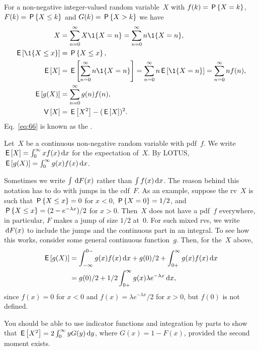 \documentclass[stochastic-or.tex]{subfiles}
\begin{document}
For a non-negative integer-valued random variable~$X$ with  $f(k)= \P{X = k}$,
 $F(k)=\P{X\leq k}$ and  $G(k) = \P{X>k}$ we have
\begin{subequations}\label{eq:105}
\begin{align}
X&=\sum_{n=0}^\infty X\1{X=n} = \sum_{n=0}^\infty n \1{X=n}, \label{eq:77} \\
\E{\1{X\leq x}} &= \P{X\leq x}, \label{eq:74}\\
\E X &= \E{\sum_{n=0}^\infty n \1{X=n}} = \sum_{n=0}^\infty n \E{\1{X=n}} = \sum_{n=0}^\infty n f(n), \label{eq:p-78} \\
  \E{g(X)} &= \sum_{n=0}^\infty g(n) f(n), \label{eq:66} \\
  \V X &= \E{X^2} - (\E X)^2.\label{eq:68}\\
\end{align}
\end{subequations}
Eq.~\cref{eq:66} is known as the .


Let~$X$ be a continuous non-negative random variable with pdf~$f$.
We write $ \E{X} = \int_0^\infty x f(x) \d x$ for the expectation of~$X$. By LOTUS, $\E{g(X)} = \int_0^\infty g(x) f(x) \d x$.

Sometimes we write $\int \d F(x)$ rather than $\int f(x) \d x$.
The reason behind this notation has to do with jumps in the cdf~$F$.
As an example, suppose the rv~$X$ is such that $\P{X\leq x} = 0$ for $x<0$, $\P{X=0} = 1/2$, and $\P{X\leq x} = (2-e^{-\lambda x})/2$ for $x>0$.
Then~$X$ does not have a pdf~$f$ everywhere, in particular, $F$ makes a jump of size $1/2$ at~$0$.
For such mixed rvs, we write $\d F(x)$ to include the jumps and the continuous part in an integral.
To see how this works, consider some general continuous function~$g$.
Then, for the~$X$ above,
\begin{align*}
\E{g(X)} &= \int_{-\infty}^{0-} g(x) f(x) \d x + g(0)/2 + \int_{0+}^{\infty} g(x) f(x) \d x \\
 &= g(0)/2 + 1/2 \int_{0+}^{\infty} g(x) \lambda e^{-\lambda x} \d x,
\end{align*}
since $f(x) = 0$ for $x<0$ and $f(x) = \lambda e^{-\lambda x}/2$ for $x>0$, but  $f(0)$ is not defined.


You should be able to use indicator functions and integration by parts to show that $\E{X^2} = 2\int_0^\infty y G(y) \d y$, where $G(x) = 1- F(x)$, provided the second moment exists.
\end{document}
